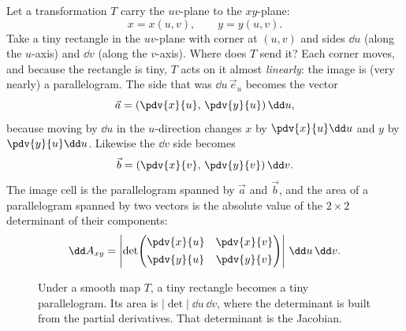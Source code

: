 Let a transformation $T$ carry the $uv$-plane to the $xy$-plane:
\[
  x=x(u,v),\qquad y=y(u,v).
\]
Take a tiny rectangle in the $uv$-plane with corner at $(u,v)$ and sides
$\dd u$ (along the $u$-axis) and $\dd v$ (along the $v$-axis). Where does $T$ send
it? Each corner moves, and because the rectangle is tiny, $T$ acts on it almost
\emph{linearly}: the image is (very nearly) a parallelogram. The side that was
$\dd u\,\vec{e}_u$ becomes the vector
\[
  \vec{a}=\left(\pdv{x}{u},\,\pdv{y}{u}\right)\dd u,
\]
because moving by $\dd u$ in the $u$-direction changes $x$ by $\pdv{x}{u}\dd u$
and $y$ by $\pdv{y}{u}\dd u$. Likewise the $\dd v$ side becomes
\[
  \vec{b}=\left(\pdv{x}{v},\,\pdv{y}{v}\right)\dd v .
\]
The image cell is the parallelogram spanned by $\vec a$ and $\vec b$, and the area
of a parallelogram spanned by two vectors is the absolute value of the
$2\times 2$ determinant of their components:
\[
  \dd A_{xy}
  =\left|\det\!\begin{pmatrix}\pdv{x}{u} & \pdv{x}{v}\\[4pt]
                              \pdv{y}{u} & \pdv{y}{v}\end{pmatrix}\right|
  \,\dd u\,\dd v .
\]

\begin{figure}[H]
\centering
{}
\caption{Under a smooth map $T$, a tiny rectangle becomes a tiny parallelogram.
Its area is $|\det|\;\dd u\,\dd v$, where the determinant is built from the
partial derivatives. That determinant is the Jacobian.}
\label{ch34:fig-jacobian}
\end{figure}

